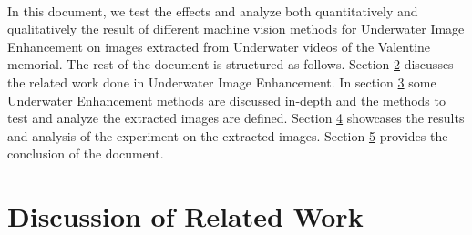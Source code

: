 \documentclass[a4paper,11pt,oneside]{article}
\begin{document}
  \\
  In this document, we test the effects and analyze both quantitatively and qualitatively the result of different machine vision methods for Underwater Image Enhancement on images extracted from Underwater videos of the Valentine memorial. The rest of the document is structured as follows. Section \hyperref[sec:2]{2} discusses the related work done in Underwater Image Enhancement. In section \hyperref[sec:3]{3} some Underwater Enhancement methods are discussed in-depth and the methods to test and analyze the extracted images are defined. Section \hyperref[sec:4]{4} showcases the results and analysis of the experiment on the extracted images. Section \hyperref[sec:5]{5} provides the conclusion of the document.  

 

  \section{Discussion of Related Work}
  \label{sec:2}

\end{document}
